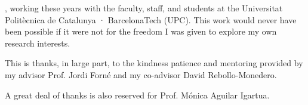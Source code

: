 
, working these years with the faculty, staff, and students at the Universitat Politècnica de Catalunya · BarcelonaTech (UPC). This work would never have been possible if it were not for the freedom I was given to explore my own research interests.

This is thanks, in large part, to the kindness patience and mentoring provided by my advisor Prof. Jordi Forn\'e and my co-advisor David Rebollo-Monedero.

A great deal of thanks is also reserved for Prof. Mónica Aguilar Igartua.